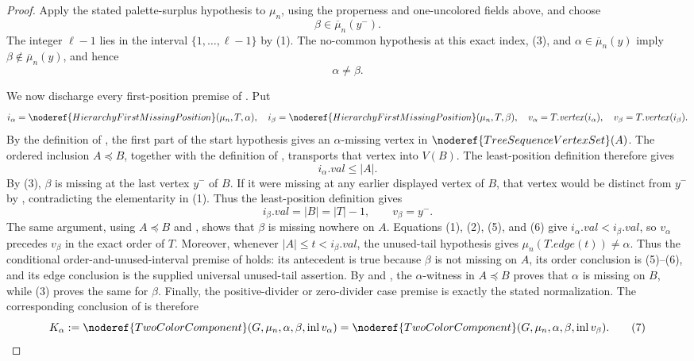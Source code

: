 \begin{proof}
Apply the stated palette-surplus hypothesis to \(\mu_n\), using the
properness and one-uncolored fields above, and choose
\[
                         \beta\in\overline\mu_n(y^-).          \tag{3}
\]
The integer \(\ell-1\) lies in the interval
\(\{1,\ldots,\ell-1\}\) by (1).  The no-common hypothesis at this exact
index, (3), and
\(\alpha\in\overline\mu_n(y)\) imply
\(\beta\notin\overline\mu_n(y)\), and hence
\[
                              \alpha\ne\beta.                 \tag{4}
\]

We now discharge every first-position premise of
.  Put
\[
 i_\alpha=\noderef{HierarchyFirstMissingPosition}(\mu_n,T,\alpha),
 \quad i_\beta=\noderef{HierarchyFirstMissingPosition}(\mu_n,T,\beta),
 \quad v_\alpha=T.\mathit{vertex}(i_\alpha),
 \quad v_\beta=T.\mathit{vertex}(i_\beta).
\]
By the definition of , the first part of the
start hypothesis gives an \(\alpha\)-missing vertex in
\(\noderef{TreeSequenceVertexSet}(A)\).  The ordered inclusion
\(A\preccurlyeq B\), together with the definition of
, transports that vertex into \(V(B)\).
The least-position definition therefore gives
\[
                 i_\alpha.\mathit{val}\leq |A|.               \tag{5}
\]
By (3), \(\beta\) is missing at the last vertex \(y^-\) of \(B\).
If it were missing at any earlier displayed vertex of \(B\), that vertex
would be distinct from \(y^-\) by , contradicting
the elementarity in (1).  Thus the least-position definition gives
\[
 i_\beta.\mathit{val}=|B|=|T|-1,\qquad v_\beta=y^-.          \tag{6}
\]
The same argument, using \(A\preccurlyeq B\) and
, shows that \(\beta\) is missing nowhere
on \(A\).
Equations (1), (2), (5), and (6) give
\(i_\alpha.\mathit{val}<i_\beta.\mathit{val}\), so
\(v_\alpha\) precedes \(v_\beta\) in the exact order of \(T\).
Moreover, whenever
\(|A|\leq t<i_\beta.\mathit{val}\), the unused-tail hypothesis gives
\(\mu_n(T.\mathit{edge}(t))\ne\alpha\).  Thus the conditional
order-and-unused-interval premise of  holds: its
antecedent is true because \(\beta\) is not missing on \(A\), its order
conclusion is (5)--(6), and its edge conclusion is the supplied universal
unused-tail assertion.  By  and
, the \(\alpha\)-witness in
\(A\preccurlyeq B\) proves that \(\alpha\) is missing on \(B\), while
(3) proves the same for \(\beta\).  Finally, the
positive-divider or zero-divider case premise is exactly the stated
normalization.  The corresponding conclusion of
 is therefore
\[
 K_\alpha:=\noderef{TwoColorComponent}
   (G,\mu_n,\alpha,\beta,\operatorname{inl}v_\alpha)
 =\noderef{TwoColorComponent}
   (G,\mu_n,\alpha,\beta,\operatorname{inl}v_\beta).          \tag{7}
\]


\end{proof}
